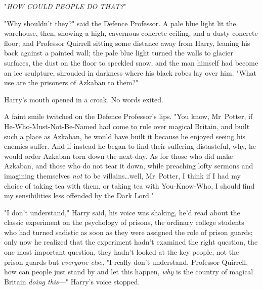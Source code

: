 "\emph{HOW COULD PEOPLE DO THAT?}"

"Why shouldn't they?" said the Defence Professor. A pale blue light lit the
warehouse, then, showing a high, cavernous concrete ceiling, and a dusty
concrete floor; and Professor Quirrell sitting some distance away from Harry,
leaning his back against a painted wall; the pale blue light turned the walls
to glacier surfaces, the dust on the floor to speckled snow, and the man
himself had become an ice sculpture, shrouded in darkness where his black robes
lay over him. "What use are the prisoners of Azkaban to them?"

Harry's mouth opened in a croak. No words exited.

A faint smile twitched on the Defence Professor's lips. "You know, Mr~Potter,
if He-Who-Must-Not-Be-Named had come to rule over magical Britain, and built
such a place as Azkaban, he would have built it because he enjoyed seeing his
enemies suffer. And if instead he began to find their suffering distasteful,
why, he would order Azkaban torn down the next day. As for those who did make
Azkaban, and those who do not tear it down, while preaching lofty sermons and
imagining themselves \emph{not} to be villains…well, Mr~Potter, I
think if I had my choice of taking tea with them, or taking tea with
You-Know-Who, I should find my sensibilities less offended by the Dark Lord."

"I don't understand," Harry said, his voice was shaking, he'd read about the
classic experiment on the psychology of prisons, the ordinary college students
who had turned sadistic as soon as they were assigned the role of prison
guards; only now he realized that the experiment hadn't examined the right
question, the one most important question, they hadn't looked at the key
people, not the prison guards but \emph{everyone else,} "I really don't
understand, Professor Quirrell, how can people just stand by and let this
happen, \emph{why} is the country of magical Britain \emph{doing this}—"
Harry's voice stopped.


